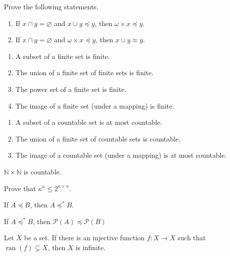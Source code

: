 \documentclass{ctexart}
\newif\ifpreface
\begin{document}
\large
\setlength{\baselineskip}{1.2em}
\ifpreface

\else
\maketitle
\fi
{}
\newcommand{\peq}{\preccurlyeq}
\begin{problem}
Prove the following statements.
\begin{enumerate}
\item If $x \cap y=\varnothing$ and $x \cup y \preccurlyeq y$, then $\omega \times x \preccurlyeq y$.
\item If $x \cap y=\varnothing$ and $\omega \times x \preccurlyeq y$, then $x \cup y \approx y$.
\end{enumerate}
\end{problem}


\begin{problem}
\begin{enumerate}[ref=\theproblem.\arabic*]
\item\label{it:2.1} A subset of a finite set is finite.
\item\label{it:2.2} The union of a finite set of finite sets is finite.
\item The power set of a finite set is finite.
\item The image of a finite set (under a mapping) is finite.
\end{enumerate}
\end{problem}


\begin{problem}
\begin{enumerate}
\item A subset of a countable set is at most countable.
\item The union of a finite set of countable sets is countable.
\item The image of a countable set (under a mapping) is at most countable.
\end{enumerate}
\end{problem}


\begin{problem}
$\mathbb{N} \times \mathbb{N}$ is countable.
\end{problem}


\begin{problem}
Prove that $\kappa^\kappa \leq 2^{\kappa \times \kappa}$.
\end{problem}


\begin{problem}
If $A \preccurlyeq B$, then $A \preccurlyeq^* B$.
\end{problem}


\begin{problem}
If $A \preccurlyeq^* B$, then $\mathscr{P}(A) \preccurlyeq \mathscr{P}(B)$
\end{problem}


\begin{problem}
Let $X$ be a set. If there is an injective function $f: X \rightarrow X$ such that $\operatorname{ran}(f) \subsetneq X$, then $X$ is infinite.
\end{problem}
\end{document}
